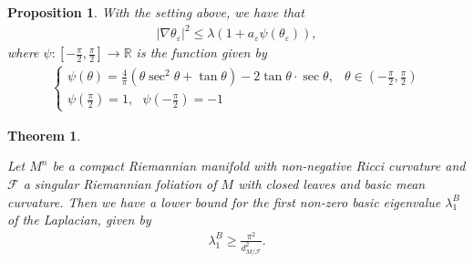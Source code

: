 \documentclass[10pt,a4paper]{amsart}
\newtheorem{theorem}{Theorem}
\newtheorem{proposition}{Proposition}
\begin{document}
\begin{proposition}\label{oo}
With the setting above, we have that \begin{align}\label{zzzzz}
    \vert\nabla\theta_\varepsilon\vert^2\leq \lambda(1+a_\varepsilon\psi(\theta_\varepsilon)),
\end{align}where $\psi:\left[-\frac{\pi}{2},\frac{\pi}{2}\right]\to\mathbb{R}$ is the function given by
\begin{align*}
        \left\{\begin{array}{lc}
             \psi(\theta)=\frac{4}{\pi}(\theta\sec^2\theta+\tan\theta)-2\tan\theta\cdot\sec\theta,& \theta\in\left(-\frac{\pi}{2},\frac{\pi}{2}\right) \\
             \psi\left(\frac{\pi}{2}\right)=1,\text{ }\psi\left(-\frac{\pi}{2}\right)=-1& 
        \end{array}\right.
    \end{align*}
\end{proposition}

        \begin{theorem}\label{main1}

    Let $M^n$ be a compact Riemannian manifold with non-negative Ricci curvature and $\mathcal{F}$ a singular Riemannian foliation of $M$ with closed leaves and basic mean curvature. Then we have a lower bound for the first non-zero basic eigenvalue $\lambda_1^B$ of the Laplacian, given by \begin{align}
        \lambda_1^B\geq \frac{\pi^2}{d_{M/\mathcal{F}}^2}.
    \end{align}
\end{theorem}
\end{document}
